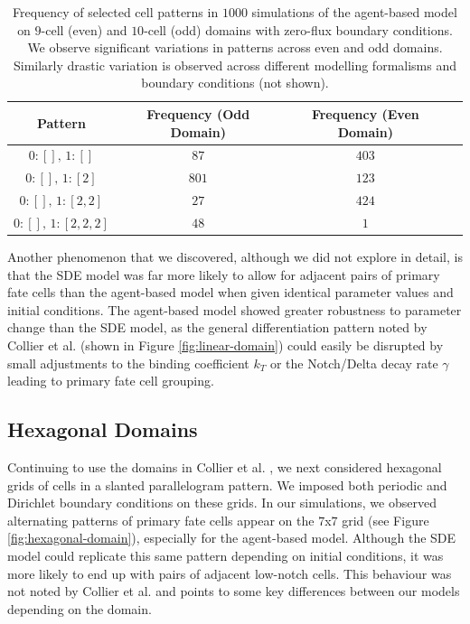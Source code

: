 \documentclass{article}
\begin{document}
\begin{table}[!htp]
\centering
\begin{tabular}{|c|c|c|c|} 
 \hline
 Pattern & Frequency (Odd Domain) & Frequency (Even Domain)  \\
 \hline
 $0: [], \, 1: []$ & $87$ & $403$ \\
 $0: [], \, 1: [2]$ & $801$ & $123$ \\
 $0: [], \, 1: [2, 2]$ & $27$ & $424$ \\
 $0: [], \, 1: [2, 2, 2]$ & $48$ & $1$ \\
 \hline
\end{tabular}
\caption{
  Frequency of selected cell patterns in $1000$ simulations of the agent-based model on $9$-cell (even) and $10$-cell (odd) domains with zero-flux boundary conditions.
  We observe significant variations in patterns across even and odd domains.
  Similarly drastic variation is observed across different modelling formalisms and boundary conditions (not shown).
}
\label{tb:patterns}
\end{table}

Another phenomenon that we discovered, although we did not explore in detail, is that the SDE model was far more likely to allow for adjacent pairs of primary fate cells than the agent-based model when given identical parameter values and initial conditions.
The agent-based model showed greater robustness to parameter change than the SDE model, as the general differentiation pattern noted by Collier et al. (shown in Figure \ref{fig:linear-domain}) could easily be disrupted by small adjustments to the binding coefficient $k_T$ or the Notch/Delta decay rate $\gamma$ leading to primary fate cell grouping.

\subsection*{Hexagonal Domains}

Continuing to use the domains in Collier et al. \cite{collier_pattern_1996}, we next considered hexagonal grids of cells in a slanted parallelogram pattern. 
We imposed both periodic and Dirichlet boundary conditions on these grids.
In our simulations, we observed alternating patterns of primary fate cells appear on the $7$x$7$ grid (see Figure \ref{fig:hexagonal-domain}), especially for the agent-based model.
Although the SDE model could replicate this same pattern depending on initial conditions, it was more likely to end up with pairs of adjacent low-notch cells.
This behaviour was not noted by Collier et al. and points to some key differences between our models depending on the domain.
\end{document}
